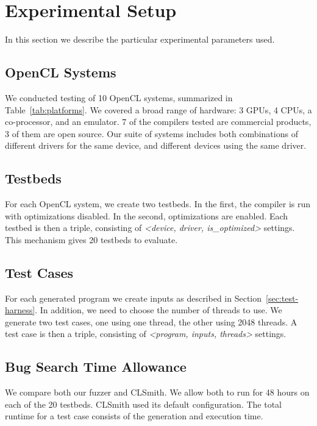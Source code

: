 \section{Experimental Setup}

In this section we describe the particular experimental parameters used.

\subsection{OpenCL Systems}

\begin{table*}[t!]
  \footnotesize %
  \centering %
  
  \caption{%
    OpenCL systems and the number of bug reports submitted to date. For each system, two testbeds are created, one with compiler optimizations, the other without.%
    \vspace{-.5em}
  }
  \label{tab:platforms}
\end{table*}

We conducted testing of 10 OpenCL systems, summarized in Table~\ref{tab:platforms}.  We covered a broad range of hardware: 3 GPUs, 4 CPUs, a co-processor, and an emulator. 7 of the compilers tested are commercial products, 3 of them are open source. Our suite of systems includes both combinations of different drivers for the same device, and different devices using the same driver.

\subsection{Testbeds}
For each OpenCL system, we create two testbeds. In the first, the compiler is run with optimizations disabled. In the second, optimizations are enabled. Each testbed is then a triple, consisting of \emph{<device, driver, is\_optimized>} settings. This mechanism gives 20 testbeds to evaluate. 

\subsection{Test Cases}
For each generated program we create inputs as described in Section~\ref{sec:test-harness}. In addition, we need to choose the number of threads to use. We generate two test cases, one using one thread, the other using 2048 threads. A test case is then a triple, consisting of \emph{<program, inputs, threads>} settings.

\subsection{Bug Search Time Allowance}
We compare both our fuzzer and CLSmith. We allow both to run for 48 hours on each of the 20 testbeds.  CLSmith used its default configuration. The total runtime for a test case consists of the generation and execution time.
